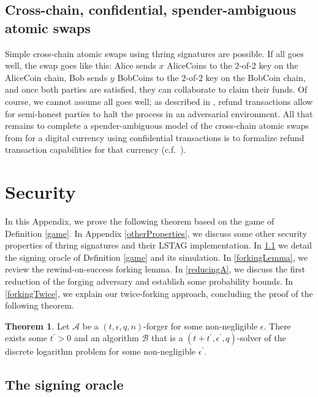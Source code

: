 \documentclass{mrl}
\theoremstyle{definition}
\newtheorem{theorem}{Theorem}
\numberwithin{theorem}{subsection}
\newcommand{\adversary}{\mathcal{A}}
\begin{document}
\subsection{Cross-chain, confidential, spender-ambiguous atomic swaps}

Simple cross-chain atomic swaps using thring signatures are possible. If all goes well, the swap goes like this: Alice sends $x$ AliceCoins to the $2$-of-$2$ key on the AliceCoin chain, Bob sends $y$ BobCoins to the $2$-of-$2$ key on the BobCoin chain, and once both parties are satisfied, they can collaborate to claim their funds. Of course, we cannot assume all goes well; as described in \cite{back2014enabling}, refund transactions allow for semi-honest parties to halt the process in an adversarial environment. All that remains to complete a spender-ambiguous model of the cross-chain atomic swaps from \cite{back2014enabling} for a digital currency using confidential transactions is to formalize refund transaction capabilities for that currency (c.f.\ \cite{noether2018dlsag}).






\appendix 

\section{Security}\label{security}

In this Appendix, we prove the following theorem based on the game of Definition \ref{game}. In Appendix \ref{otherProperties}, we discuss some other security properties of thring signatures and their LSTAG implementation. In \ref{sigoracle} we detail the signing oracle of Definition \ref{game} and its simulation. In \ref{forkingLemma}, we review the rewind-on-success forking lemma. In \ref{reducingA}, we discuss the first reduction of the forging adversary and establish some probability bounds. In \ref{forkingTwice}, we explain our twice-forking approach, concluding the proof of the following theorem.


\begin{theorem}
Let $\adversary$ be a $(t,\epsilon,q,n)$-forger for some non-negligible $\epsilon$. There exists some $t^\prime > 0$ and an algorithm $\mathcal{B}$ that is a $(t+t^\prime, \epsilon^\prime, q)$-solver of the discrete logarithm problem for some non-negligible $\epsilon^\prime$.
\end{theorem}

\subsection{The signing oracle}\label{sigoracle}
\end{document}
